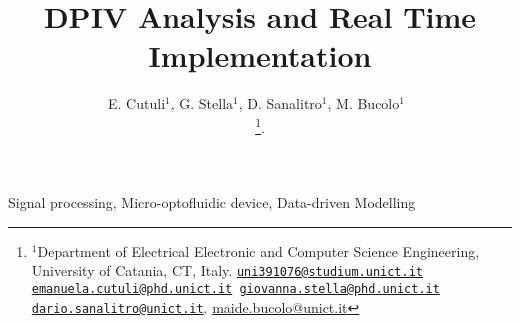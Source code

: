 \documentclass[journal]{IEEEtran}
\title{DPIV Analysis and Real Time Implementation}
\author{E. Cutuli${^{1}}$, G. Stella${^{1}}$, D. Sanalitro${^{1}}$, M. Bucolo${^{1}}$~\IEEEmembership{Senior Member,~IEEE}

\thanks{$^1$Department of Electrical Electronic and Computer Science Engineering, University of Catania, CT, Italy. {\tt \scriptsize\href{mailto:uni391076@studium.unict.it}{\mbox{uni391076@studium.unict.it}}
\scriptsize\href{mailto:emaunuela.cutuli@phd.unict.it}{\mbox{emanuela.cutuli@phd.unict.it}}
\scriptsize\href{mailto:giovanna.stella@phd.unict.it}{\mbox{giovanna.stella@phd.unict.it}}
\scriptsize\href{mailto:dario.sanalitro@unict.it}{\mbox{dario.sanalitro@unict.it}}}. 
\scriptsize\href{mailto:maide.bucolo@unict.it}{\mbox{maide.bucolo@unict.it}}}. 
}
\theoremstyle{definition}
\theoremstyle{remark}
\begin{document}


\maketitle

\begin{abstract}

\end{abstract}

\begin{IEEEkeywords}
	Signal processing, Micro-optofluidic device, Data-driven Modelling
\end{IEEEkeywords}




\end{document}
